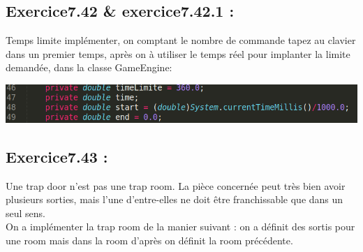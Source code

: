 \documentclass[french,10pt,a4paper]{report}
\begin{document}
\subsection{\textcolor{bb}{Exercice7.42  \& exercice7.42.1 :}}
Temps limite implémenter, on comptant le nombre de commande tapez au clavier dans un premier temps, après on à utiliser le temps réel pour implanter la limite demandée, dans la classe GameEngine:
\begin{center}
	\includegraphics[scale=0.35]{captures/it4_1.png}
\end{center}

\subsection{\textcolor{bb}{Exercice7.43 :}}
Une trap door n'est pas une trap room. La pièce concernée peut très bien avoir plusieurs sorties, mais l'une d'entre-elles ne doit être franchissable que dans un seul sens.\\
On a implémenter la trap room de la manier suivant : on a définit des sortis pour une room mais dans la room d’après on définit la room précédente.
\end{document}
